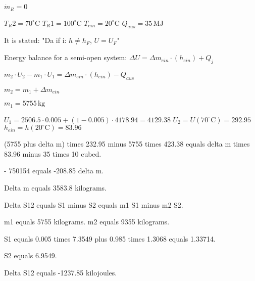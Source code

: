\( \dot{m}_R = 0 \)  

\( T_R2 = 70^\circ \text{C} \)  
\( T_R1 = 100^\circ \text{C} \)  
\( T_{ein} = 20^\circ \text{C} \)  
\( Q_{aus} = 35 \, \text{MJ} \)  

It is stated:  
"Da if i: \( h \neq h_F \), \( U = U_F \)"  

Energy balance for a semi-open system:  
\( \Delta U = \Delta m_{ein} \cdot (h_{ein}) + Q_j \)  

\( m_2 \cdot U_2 - m_1 \cdot U_1 = \Delta m_{ein} \cdot (h_{ein}) - Q_{aus} \)  

\( m_2 = m_1 + \Delta m_{ein} \)  

\( m_1 = 5755 \, \text{kg} \)  

\( U_1 = 2506.5 \cdot 0.005 + (1 - 0.005) \cdot 4178.94 = 4129.38 \)  
\( U_2 = U(70^\circ \text{C}) = 292.95 \)  
\( h_{ein} = h(20^\circ \text{C}) = 83.96 \)

(5755 plus delta m) times 232.95 minus 5755 times 423.38 equals delta m times 83.96 minus 35 times 10 cubed.  

- 750154 equals -208.85 delta m.  

Delta m equals 3583.8 kilograms.  

Delta S12 equals S1 minus S2 equals m1 S1 minus m2 S2.  

m1 equals 5755 kilograms.  
m2 equals 9355 kilograms.  

S1 equals 0.005 times 7.3549 plus 0.985 times 1.3068 equals 1.33714.  

S2 equals 6.9549.  

Delta S12 equals -1237.85 kilojoules.